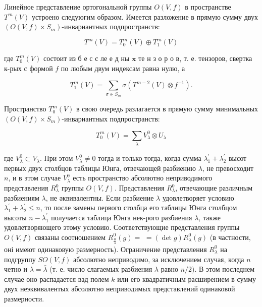 \documentclass[10pt]{article}
\begin{document}
Линейное представление ортогональной группы $O(V, f)$ в пространстве $T^{m}(V)$ устроено следуюгим образом. Имеется разложение в прямую сумму двух $\left(O(V, f) \times S_{m}\right)$-инвариантных подпространств:



\[

T^{m}(V)=T_{0}^{m}(V) \oplus T_{1}^{m}(V)

\]



где $T_{0}^{m}(V)$ состоит из б е с с ле е д ны $\mathbf{x}$ те н з о р о в, т. е. тензоров, свертка к-рых с формой $f$ по любым двум индексам равна нулю, а



\[

T_{1}^{m}(V)=\sum_{\sigma \in S_{m}} \sigma\left(T^{m-2}(V) \otimes f^{-1}\right) .

\]



Пространство $T_{0}^{m}(V)$ в свою очередь разлагается в прямую сумму минимальных $\left(O(V, f) \times S_{m}\right)$-инвариантных подпространств:



\[

T_{0}^{m}(V)=\sum_{\lambda} V_{\lambda}^{0} \otimes U_{\lambda}

\]



где $V_{\lambda}^{0} \subset V_{\lambda}$. При этом $V_{\lambda}^{0} \neq 0$ тогда и только тогда, когда сумма $\lambda_{1}^{\prime}+\lambda_{2}^{\prime}$ высот первых двух столбцов таблицы Юнга, отвечающей разбиению $\lambda$, не превосходит $n$, и в этом случае $V_{\lambda}^{0}$ есть пространство абсолютно неприводимого представления $R_{\lambda}^{0}$ группы $O(V, f)$. Представления $R_{\lambda}^{0}$, отвечающие различным разбиениям $\lambda$, не әквивалентны. Если разбиение $\lambda$ удовлетворяет условию $\lambda_{1}^{\prime}+\lambda_{2}^{\prime} \leqslant n$, то после замены первого столбца его таблицы Юнга столбцом высоты $n-\lambda_{1}^{\prime}$ получается таблица Юнга нек-рого разбиения $\bar{\lambda}$, также удовлетворяющего этому условию. Соответствующие представления группы $O(V, f)$ связаны соотношением $R_{\frac{0}{\lambda}}^{0}(g)=$ $=(\operatorname{det} g) R_{\lambda}^{0}(g)$ (в частности, оні имеют одинаковую размерность). Ограничение представления $R_{\lambda}^{0}$ на подгруппу $S O(V, f)$ абсолютно неприводимо, за исключением случая, когда $n$ четно и $\lambda=\bar{\lambda}$ (т. е. число слагаемых разбиения $\lambda$ равно $n / 2)$. В этом последнем случае оно распадается вад полем $k$ или его квадратичным расширением в сумму двух неэквивалентых абсолютно неприводимых представлений одинаковой размерности.
\end{document}
